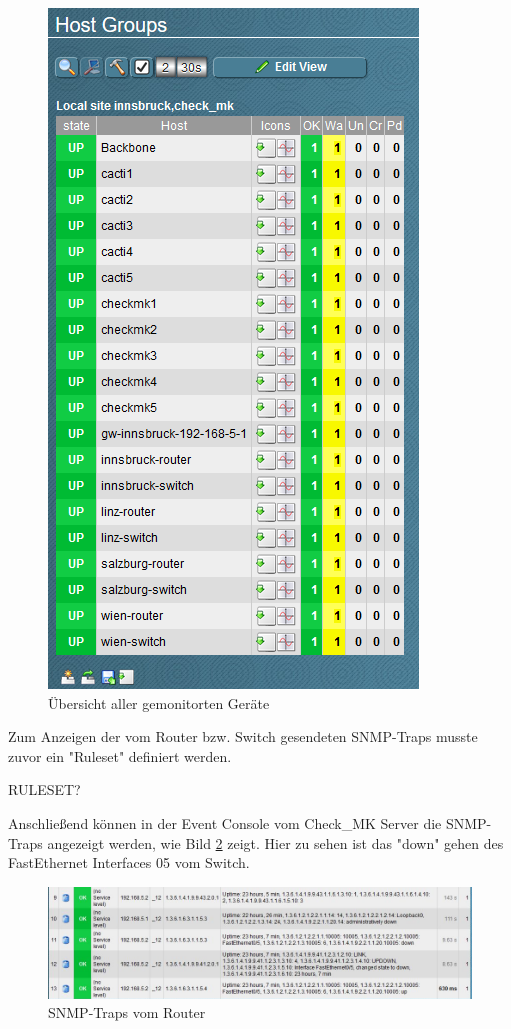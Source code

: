\begin{figure}[H]
	\centering
	\includegraphics[scale=1]{img/hostgroups.PNG}
	\caption{Übersicht aller gemonitorten Geräte}
	\label{img:uebersicht}
\end{figure}

Zum Anzeigen der vom Router bzw. Switch gesendeten \ac{SNMP}-Traps musste zuvor ein "Ruleset" definiert werden. 

RULESET?

Anschließend können in der Event Console vom Check\_MK Server die \ac{SNMP}-Traps angezeigt werden, wie Bild \ref{img:console} zeigt. Hier zu sehen ist das "down" gehen des FastEthernet Interfaces  05 vom Switch.

\begin{figure}[H]
	\centering
	\includegraphics[scale=0.59]{img/EventConsole_cut.PNG}
	\caption{SNMP-Traps vom Router}
	\label{img:console}
\end{figure}

